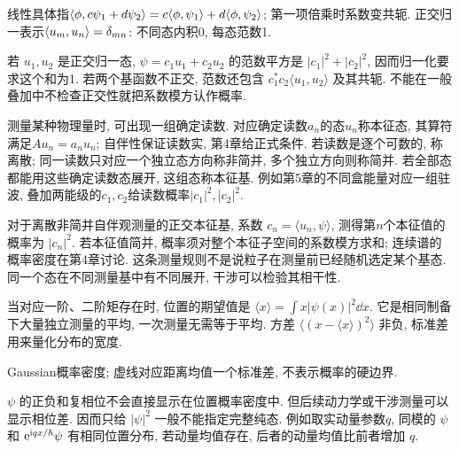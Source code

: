 线性具体指$\langle \phi,c\psi_1+d\psi_2\rangle=c\langle \phi,\psi_1\rangle+d\langle \phi,\psi_2\rangle$; 第一项倍乘时系数变共轭. 正交归一表示$\langle u_m,u_n\rangle=\delta_{mn}$: 不同态内积0, 每态范数1.

若 $u_1,u_2$ 是正交归一态, $\psi=c_1u_1+c_2u_2$ 的范数平方是 $|c_1|^2+|c_2|^2$, 因而归一化要求这个和为1. 若两个基函数不正交, 范数还包含 $c_1^*c_2\langle u_1,u_2\rangle$ 及其共轭. 不能在一般叠加中不检查正交性就把系数模方认作概率.

测量某种物理量时, 可出现一组确定读数. 对应确定读数$a_n$的态$u_n$称本征态, 其算符满足$Au_n=a_nu_n$; 自伴性保证读数实, 第4章给正式条件. 若读数是逐个可数的, 称离散; 同一读数只对应一个独立态方向称非简并, 多个独立方向则称简并. 若全部态都能用这些确定读数态展开, 这组态称本征基. 例如第5章的不同盒能量对应一组驻波, 叠加两能级的$c_1,c_2$给读数概率$|c_1|^2,|c_2|^2$.

对于离散非简并自伴观测量的正交本征基, 系数 $c_n=\langle u_n,\psi\rangle$, 测得第$n$个本征值的概率为 $|c_n|^2$. 若本征值简并, 概率须对整个本征子空间的系数模方求和; 连续谱的概率密度在第4章讨论. 这条测量规则不是说粒子在测量前已经随机选定某个基态. 同一个态在不同测量基中有不同展开, 干涉可以检验其相干性.

当对应一阶、二阶矩存在时, 位置的期望值是 $\langle x\rangle=\int x|\psi(x)|^2\dd x$. 它是相同制备下大量独立测量的平均, 一次测量无需等于平均. 方差 $\langle(x-\langle x\rangle)^2\rangle$ 非负, 标准差用来量化分布的宽度.

\begin{center}
\par Gaussian概率密度; 虚线对应距离均值一个标准差, 不表示概率的硬边界.
\end{center}

$\psi$ 的正负和复相位不会直接显示在位置概率密度中. 但后续动力学或干涉测量可以显示相位差. 因而只给 $|\psi|^2$ 一般不能指定完整纯态. 例如取实动量参数$q$, 同模的 $\psi$ 和 $\mathrm e^{\mathrm i qx/\hbar}\psi$ 有相同位置分布, 若动量均值存在, 后者的动量均值比前者增加 $q$.
